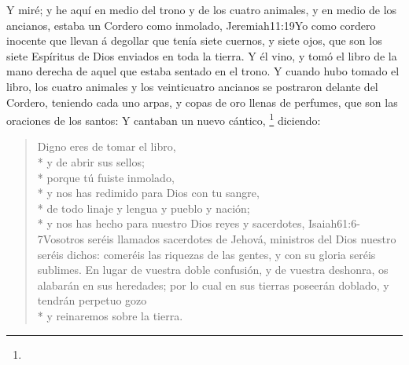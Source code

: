Y miré; y he aquí en medio del trono y de los cuatro animales, y en medio de los ancianos, estaba un Cordero como inmolado,%
					  {Jeremiah}{11:19}{Yo como cordero inocente que llevan á degollar}
 que tenía siete cuernos, y siete ojos, que son los siete Espíritus de Dios enviados en toda la tierra.%
Y él vino, y tomó el libro de la mano derecha de aquel que estaba sentado en el trono. %
Y cuando hubo tomado el libro, los cuatro animales y los veinticuatro ancianos se postraron delante del Cordero, teniendo cada uno arpas, y copas de oro llenas de perfumes, que son las oraciones de los santos:%
Y cantaban un nuevo cántico,%
	\footnote{ %
	}
 diciendo:
\begin{verse}
Digno eres de tomar el libro,\\*
\vin y de abrir sus sellos;\\* 
porque tú fuiste inmolado,\\*
\vin y nos has redimido para Dios con tu sangre,\\* 
\vin de todo linaje y lengua y pueblo y nación;\\* %
y nos has hecho para nuestro Dios reyes y sacerdotes,%
				{Isaiah}{61:6-7}{Vosotros seréis llamados sacerdotes de Jehová, ministros del Dios nuestro seréis dichos: comeréis las riquezas de las gentes, y con su gloria seréis sublimes. En lugar de vuestra doble confusión, y de vuestra deshonra, os alabarán en sus heredades; por lo cual en sus tierras poseerán doblado, y tendrán perpetuo gozo}\\*
\vin y reinaremos sobre la tierra.
\end{verse}

